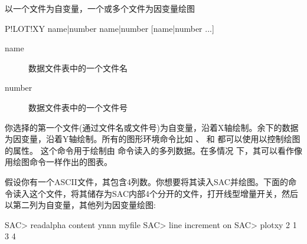 \label{cmd:plotxy}

以一个文件为自变量，一个或多个文件为因变量绘图

\begin{SACSTX}
P!LOT!XY name|number name|number [name|number ...]
\end{SACSTX}

\begin{description}
\item [name] 数据文件表中的一个文件名
\item [number] 数据文件表中的一个文件号
\end{description}

你选择的第一个文件(通过文件名或文件号)为自变量，沿着X轴绘制。余下的数据
为因变量，沿着Y轴绘制。所有的图形环境命令比如 、
 和  都可以使用以控制绘图的属性。
这个命令用于绘制由  命令读入的多列数据。在多情况
下，其可以看作像用绘图命令一样作出的图表。

假设你有一个ASCII文件，其包含4列数。你想要将其读入SAC并绘图。下面的命令读入这个文件，将其储存为SAC内部4个分开的文件，打开线型增量开关，然后以第二列为自变量，其他列为因变量绘图:
\begin{SACCode}
SAC> readalpha content ynnn myfile
SAC> line increment on
SAC> plotxy 2 1 3 4
\end{SACCode}
